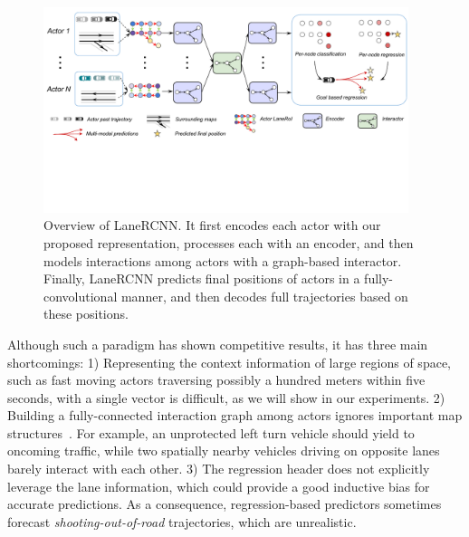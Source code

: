 \begin{figure}[t]
\begin{center}
  \includegraphics[height=6.0cm]{figures/lanercnn.pdf}
\end{center}
\vspace{-0.3cm}
\caption{Overview of LaneRCNN. It first
encodes each actor with our proposed \ROI representation, processes
each \ROI with an encoder, and then models interactions among actors with a
graph-based interactor. Finally, LaneRCNN predicts final positions of actors in
a fully-convolutional manner, and then decodes full trajectories based on these
positions.}
\vspace{-0.1cm}
\label{fig:lanercnn}
\end{figure}

Although such a paradigm has shown competitive results, it has three main shortcomings:
1) Representing the context information of large regions of space, such as fast
moving actors traversing possibly a hundred meters within five seconds, with a
single vector is difficult, as we will show in our experiments.
2) Building a fully-connected interaction graph among actors ignores important map
structures~\cite{lgn,vectornet}. For example, an unprotected left turn vehicle should yield to oncoming traffic, while two
spatially nearby vehicles driving on opposite lanes barely interact with each other.
3) The regression header does not explicitly leverage the lane information, which could provide a good inductive bias for accurate predictions. 
As a consequence, regression-based
predictors sometimes forecast \textit{shooting-out-of-road} trajectories, which
are unrealistic. 






